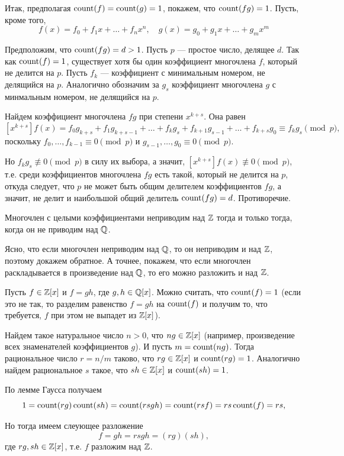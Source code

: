 \begin{enumerate}
Итак, предполагая $\mathop{\mathrm{count}}(f)=\mathop{\mathrm{count}}(g)=1$, покажем, что $\mathop{\mathrm{count}}(fg)=1$. Пусть, кроме того,
$$
f(x) = f_0+f_1x+\dots+f_nx^n,\quad g(x) = g_0+g_1x+\dots+g_mx^m
$$

Предположим, что $\mathop{\mathrm{count}}(fg)=d>1$. Пусть $p$ --- простое число, делящее $d$. Так как $\mathop{\mathrm{count}}(f)=1$, существует хотя бы один коэффициент многочлена $f$, который не делится на $p$. Пусть $f_k$ --- коэффициент с минимальным номером, не делящийся на $p$.
Аналогично обозначим за $g_s$ коэффициент многочлена $g$ с минмальным номером, не делящийся на $p$.

Найдем коэффициент многочлена $fg$ при степени $x^{k+s}$. Она равен
$$
[x^{k+s}]f(x) = f_0g_{k+s}+f_1g_{k+s-1}+\dots+f_kg_s+f_{k+1}g_{s-1}+\dots+f_{k+s}g_0\equiv f_kg_s\pmod p,
$$
поскольку
$f_0,\dots,f_{k-1}\equiv 0\pmod p$ и $g_{s-1},\dots,g_0\equiv 0\pmod p$.

Но $f_kg_s\not\equiv 0\pmod p$ в силу их выбора, а значит, $[x^{k+s}]f(x)\not\equiv 0\pmod p$, т.е. среди коэффициентов многочлена $fg$ есть такой, который не делится на $p$, откуда следует, что $p$ не может быть общим делителем коэффициентов $fg$, а значит, не делит и наибольшой общий делитель $\mathop{\mathrm{count}}(fg)=d$. Противоречие.
\epf
\begin{sled}
Многочлен с целыми коэффициентами неприводим над $\mathbb Z$ тогда и только тогда, когда он не приводим над $\mathbb Q$.
\end{sled}
\pf
Ясно, что если многочлен неприводим над $\mathbb Q$, то он неприводим и над $\mathbb Z$, поэтому докажем обратное. А точнее, покажем, что если многочлен раскладывается в произведение над $\mathbb Q$, то его можно разложить и над $\mathbb Z$.

Пусть $f\in\mathbb Z[x]$ и $f=gh$, где $g,h\in\mathbb Q[x]$. Можно считать, что $\mathop{\mathrm{count}}(f)=1$ (если это не так, то разделим равенство $f=gh$ на $\mathop{\mathrm{count}}(f)$ и получим то, что требуется, $f$ при этом не выпадет из $\mathbb Z[x]$).

Найдем такое натуральное число $n>0$, что $ng\in\mathbb Z[x]$ (например, произведение всех знаменателей коэффициентов $g$). И пусть $m=\mathop{\mathrm{count}}(ng)$. Тогда рациональное число $r=n/m$ таково, что $rg\in\mathbb Z[x]$ и $\mathop{\mathrm{count}}(rg)=1$. Аналогично найдем рациональное $s$ такое, что $sh\in\mathbb Z[x]$ и $\mathop{\mathrm{count}}(sh)=1$.

По лемме Гаусса получаем
$$
1=\mathop{\mathrm{count}}(rg)\mathop{\mathrm{count}}(sh)=\mathop{\mathrm{count}}(rsgh)=\mathop{\mathrm{count}}(rsf)=rs\mathop{\mathrm{count}}(f)=rs,
$$

Но тогда имеем слеующее разложение
$$
f=gh=rsgh=(rg)(sh),
$$
где $rg,sh\in\mathbb Z[x]$, т.е. $f$ разложим над $\mathbb Z$.
\epf


\end{enumerate}
